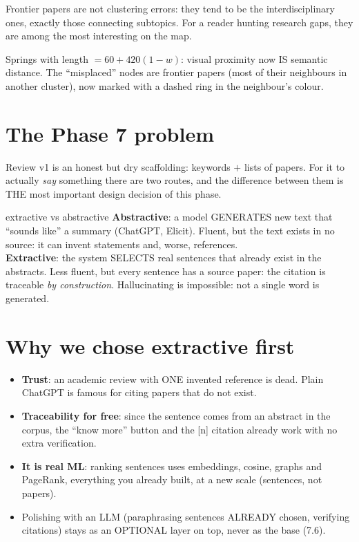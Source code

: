 \documentclass[11pt,a4paper]{article}
\begin{document}
\begin{ojo}
Frontier papers are not clustering errors: they tend to be the interdisciplinary ones, exactly
those connecting subtopics. For a reader hunting research gaps, they are among the most
interesting on the map.
\end{ojo}

\begin{resumen}
Springs with length $= 60 + 420(1-w)$: visual proximity now IS semantic distance. The
``misplaced'' nodes are frontier papers (most of their neighbours in another cluster), now
marked with a dashed ring in the neighbour's colour.
\end{resumen}
\clearpage
{}
{}

\section{The Phase 7 problem}

Review v1 is an honest but dry scaffolding: keywords $+$ lists of papers. For it to actually
\emph{say} something there are two routes, and the difference between them is THE most
important design decision of this phase.

\begin{concepto}{extractive vs abstractive}
\textbf{Abstractive}: a model GENERATES new text that ``sounds like'' a summary (ChatGPT,
Elicit). Fluent, but the text exists in no source: it can invent statements and, worse,
references. \\
\textbf{Extractive}: the system SELECTS real sentences that already exist in the abstracts.
Less fluent, but every sentence has a source paper: the citation is traceable \emph{by
construction}. Hallucinating is impossible: not a single word is generated.
\end{concepto}

\section{Why we chose extractive first}

\begin{itemize}
  \item \textbf{Trust}: an academic review with ONE invented reference is dead. Plain ChatGPT
        is famous for citing papers that do not exist.
  \item \textbf{Traceability for free}: since the sentence comes from an abstract in the
        corpus, the ``know more'' button and the [n] citation already work with no extra
        verification.
  \item \textbf{It is real ML}: ranking sentences uses embeddings, cosine, graphs and PageRank,
        everything you already built, at a new scale (sentences, not papers).
  \item Polishing with an LLM (paraphrasing sentences ALREADY chosen, verifying citations)
        stays as an OPTIONAL layer on top, never as the base (7.6).
\end{itemize}
\end{document}
